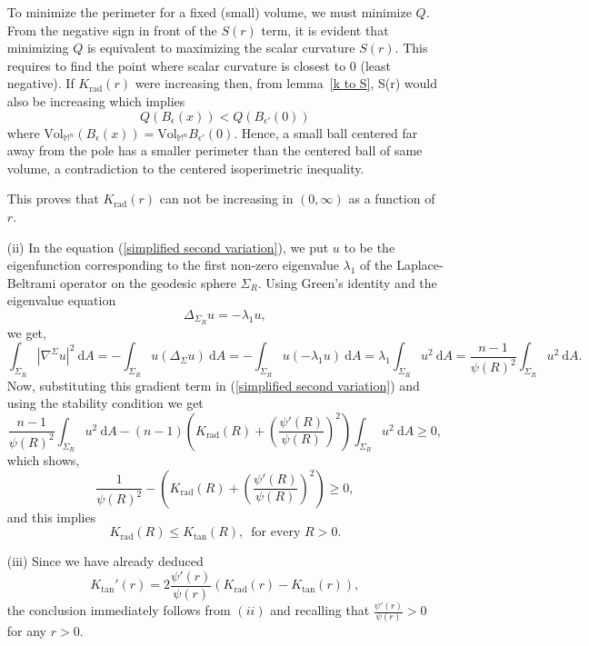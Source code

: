 \documentclass[a4paper,11pt,reqno]{amsart}
\renewcommand\eqref[1]{(\ref{#1})}
\theoremstyle{plain}
\numberwithin{equation}{section} \allowdisplaybreaks
\newcommand{\m}{\mathbb{M}^n}
\begin{document}
\begin{itemize}
\begin{equation*}
    \end{equation*}
To minimize the perimeter for a fixed (small) volume, we must minimize $Q$. From the negative sign in front of the $S(r)$ term, it is evident that minimizing $Q$ is equivalent to maximizing the scalar curvature $S(r)$. This requires to find the point where scalar curvature is closest to $0$ (least negative). If $K_{\text{rad}}(r)$ were increasing then, from lemma~\ref{k to S}, S(r) would also be increasing which implies 
\begin{equation*}
    Q(B_{\epsilon}(x))<Q(B_{\epsilon'}(0))
\end{equation*}
where $\text{Vol}_{\m}(B_{\epsilon}(x))=\text{Vol}_{\m}B_{\epsilon'}(0)$. Hence, a small ball centered far away from the pole has a smaller perimeter than the centered ball of same volume, a contradiction to the centered isoperimetric inequality. \par This proves that $K_{\text{rad}}(r)$ can not be increasing in $(0,\infty)$ as a function of $r$.
\item[(ii)] In the equation \eqref{simplified second variation}, we put $u$ to be the eigenfunction corresponding to the first non-zero eigenvalue $\lambda_1$ of the Laplace-Beltrami operator on the geodesic sphere $\Sigma_R$.
Using Green's identity and the eigenvalue equation 
\begin{equation*}
    \Delta_{\Sigma_R}u=-\lambda_1 u,
\end{equation*}
we get,
\begin{equation*}
    \int_{\Sigma_R}|\nabla^{\Sigma}u|^2\ \mathrm{d}A=-\int_{\Sigma_R} u(\Delta_{\Sigma}u)\ \mathrm{d}A=-\int_{\Sigma_R}u(-\lambda_1 u)\ \mathrm{d}A=\lambda_1\int_{\Sigma_R}u^2\ \mathrm{d}A=\frac{n-1}{\psi(R)^2}\int_{\Sigma_R}u^2\ \mathrm{d}A.
\end{equation*}
Now, substituting this gradient term in \eqref{simplified second variation} and using the stability condition we get
\begin{equation*}
    \frac{n-1}{\psi(R)^2}\int_{\Sigma_R}u^2\ \mathrm{d}A-(n-1)\left(K_{\text{rad}}(R)+\left(\frac{\psi'(R)}{\psi(R)}\right)^2\right)\int_{\Sigma_R}u^2\ \mathrm{d}A \geq 0,
\end{equation*}
which shows,
\begin{equation*}
    \frac{1}{\psi(R)^2}-\left(K_{\text{rad}}(R)+\left(\frac{\psi'(R)}{\psi(R)}\right)^2\right) \geq 0,
\end{equation*}
and this implies
\begin{equation*}
    K_{\text{rad}}(R) \leq K_{\text{tan}}(R),\,\,\,\text{for every $R>0$}.
\end{equation*}
\item[(iii)] Since we have already deduced
\begin{equation*}
    K_{\text{tan}}'(r)=2\frac{\psi'(r)}{\psi(r)}(K_{\text{rad}}(r)-K_{\text{tan}}(r)),
\end{equation*}
the conclusion immediately follows from $(ii)$ and recalling that $\frac{\psi'(r)}{\psi(r)}>0$ for any $r>0$.
\end{itemize}
\end{document}
